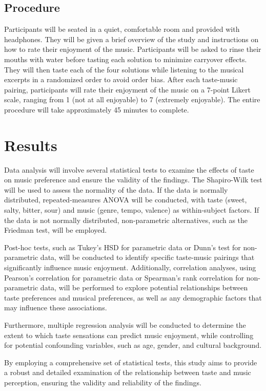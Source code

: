 \documentclass[conference]{IEEEtran}
\begin{document}
\subsection{Procedure}

Participants will be seated in a quiet, comfortable room and provided with headphones. They will be given a brief overview of the study and instructions on how to rate their enjoyment of the music. Participants will be asked to rinse their mouths with water before tasting each solution to minimize carryover effects. They will then taste each of the four solutions while listening to the musical excerpts in a randomized order to avoid order bias. After each taste-music pairing, participants will rate their enjoyment of the music on a 7-point Likert scale, ranging from 1 (not at all enjoyable) to 7 (extremely enjoyable). The entire procedure will take approximately 45 minutes to complete.

\section{Results}
Data analysis will involve several statistical tests to examine the effects of taste on music preference and ensure the validity of the findings. The Shapiro-Wilk test will be used to assess the normality of the data. If the data is normally distributed, repeated-measures ANOVA will be conducted, with taste (sweet, salty, bitter, sour) and music (genre, tempo, valence) as within-subject factors. If the data is not normally distributed, non-parametric alternatives, such as the Friedman test, will be employed.

Post-hoc tests, such as Tukey's HSD for parametric data or Dunn's test for non-parametric data, will be conducted to identify specific taste-music pairings that significantly influence music enjoyment. Additionally, correlation analyses, using Pearson's correlation for parametric data or Spearman's rank correlation for non-parametric data, will be performed to explore potential relationships between taste preferences and musical preferences, as well as any demographic factors that may influence these associations.

Furthermore, multiple regression analysis will be conducted to determine the extent to which taste sensations can predict music enjoyment, while controlling for potential confounding variables, such as age, gender, and cultural background.

By employing a comprehensive set of statistical tests, this study aims to provide a robust and detailed examination of the relationship between taste and music perception, ensuring the validity and reliability of the findings.
\end{document}

